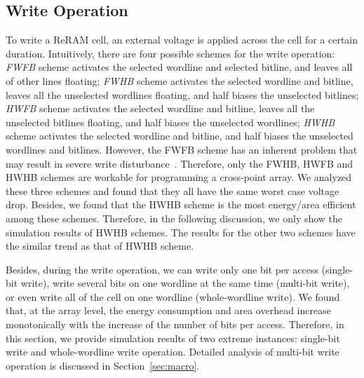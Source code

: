 \subsection{Write Operation}
To write a ReRAM cell, an external voltage is applied across the cell for
a certain duration. Intuitively, there are four possible schemes for the
write operation: \emph{FWFB} scheme activates the selected wordline and
selected bitline, and leaves all of other lines floating; \emph{FWHB}
scheme activates the selected wordline and bitline, leaves all the
unselected wordlines floating, and half biases the unselected bitlines;
\emph{HWFB} scheme activates the selected wordline and bitline, leaves all
the unselected bitlines floating, and half biases the unselected
wordlines; \emph{HWHB} scheme activates the selected wordline and bitline,
and half biases the unselected wordlines and bitlines. However, the FWFB
scheme has an inherent problem that may result in severe write
disturbance~\cite{crossbar_NANO2003_Ziegler}. Therefore, only the FWHB,
HWFB and HWHB schemes are workable for programming a cross-point array. We
analyzed these three schemes and found that they all have the same worst
case voltage drop. Besides, we found that the HWHB scheme is the most
energy/area efficient among these schemes. Therefore, in the following
discussion, we only show the simulation results of HWHB schemes. The
results for the other two schemes have the similar trend as that of HWHB
scheme.

Besides, during the write operation, we can write only one bit per access
(single-bit write), write several bits on one wordline at the same time
(multi-bit write), or even write all of the cell on one wordline
(whole-wordline write). We found that, at the array level, the energy
consumption and area overhead increase monotonically with the increase of
the number of bits per access. Therefore, in this section, we provide
simulation results of two extreme instances: single-bit write and
whole-wordline write operation. Detailed analysis of multi-bit write
operation is discussed in Section~\ref{sec:macro}.



